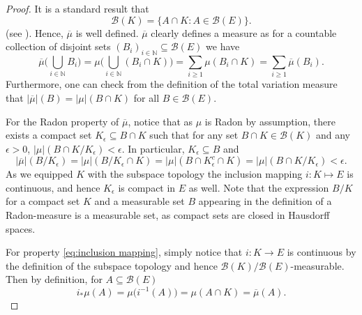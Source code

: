 \documentclass[11pt,a4paper,twoside,openany]{report}
\numberwithin{equation}{section}
\theoremstyle{plain} %
\theoremstyle{definition} %
\theoremstyle{remark} %
\let\parencite\authnumparencite
\begin{document}
\begin{proof}
    It is a standard result that 
    \begin{equation*}
        \mathcal{B}(K)=\{A\cap K:A\in\mathcal{B}(E)\}.
    \end{equation*}
    (see \parencite[Lemma.~6.2.4.]{Bogachev2007MeasureTheory}). Hence, \(\overline{\mu}\) is well defined. \(\overline{\mu}\) clearly defines a measure as for a countable collection of disjoint sets \((B_i)_{i\in\mathbb{N}}\subseteq\mathcal{B}(E)\) we have
    \begin{equation*}
        \overline{\mu}\bigg(\bigcup_{i\in\mathbb{N}}B_i\bigg)=\mu\bigg(\bigcup_{i\in\mathbb{N}}(B_i\cap K)\bigg)=\sum_{i\geq 1}\mu(B_i\cap K)=\sum_{i\geq 1}\overline{\mu}(B_i).
    \end{equation*}
    Furthermore, one can check from the definition of the total variation measure that \(|\overline{\mu}|(B)=|\mu|(B\cap K)\) for all \(B\in\mathcal{B}(E)\). 
    
    
           For the Radon property of \(\overline{\mu}\), notice that as \(\mu\) is Radon by assumption, there exists a compact set \(K_{\epsilon}\subseteq B\cap K\) such that for any set \(B\cap K\in\mathcal{B}(K)\) and any \(\epsilon>0\), \(|\mu|(B\cap K / K_{\epsilon})<\epsilon\). In particular, \(K_{\epsilon}\subseteq B\) and 
       \begin{equation*}
           |\overline{\mu}|(B/K_{\epsilon})=|\mu|(B/ K_{\epsilon}\cap K)=|\mu|(B\cap K_{\epsilon}^c\cap K)=|\mu|(B\cap K/ K_{\epsilon})<\epsilon.
       \end{equation*}
       As we equipped \(K\) with the subspace topology the inclusion mapping \(i:K\mapsto E\) is continuous, and hence \(K_{\epsilon}\) is compact in \(E\) as well. Note that the expression \(B/K\) for a compact set \(K\) and a measurable set \(B\) appearing in the definition of a Radon-measure is a measurable set, as compact sets are closed in Hausdorff spaces.

    
       For property \eqref{eq:inclusion mapping}, simply notice that \(i:K\to E\) is continuous by the definition of the subspace topology and hence \(\mathcal{B}(K)/\mathcal{B}(E)\)-measurable. Then by definition, for \(A\subseteq\mathcal{B}(E)\)
    \begin{equation*}
        i_*\mu(A) = \mu\big(i^{-1}(A)\big)=\mu(A\cap K)=\overline{\mu}(A).
    \end{equation*}
\end{proof}
\end{document}
